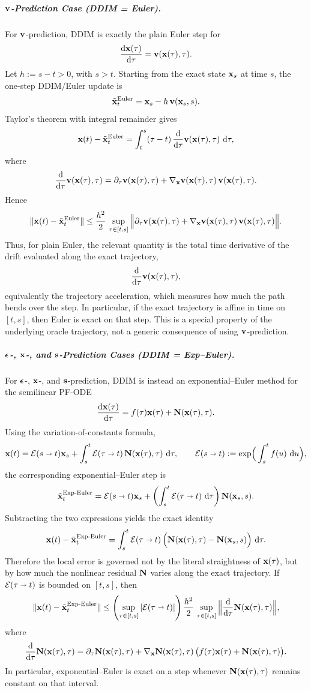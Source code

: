 \subparagraph{${\mathbf{v}}$-Prediction Case (DDIM = Euler).}
For ${\mathbf{v}}$-prediction, DDIM is exactly the plain Euler step for
\[
\frac{\mathop{}\!\mathrm{d} {\mathbf{x}}(\tau)}{\mathop{}\!\mathrm{d} \tau}={\mathbf{v}}({\mathbf{x}}(\tau),\tau).
\]
Let $h:=s-t>0$, with $s>t$. Starting from the exact state ${\mathbf{x}}_s$ at
time $s$, the one-step DDIM/Euler update is
\[
\tilde{{\mathbf{x}}}_t^{\mathrm{Euler}}
=
{\mathbf{x}}_s-h\,{\mathbf{v}}({\mathbf{x}}_s,s).
\]
Taylor's theorem with integral remainder gives
\[
{\mathbf{x}}(t)-\tilde{{\mathbf{x}}}_t^{\mathrm{Euler}}
=
\int_t^s (\tau-t)\,
\frac{\mathop{}\!\mathrm{d}}{\mathop{}\!\mathrm{d} \tau}{\mathbf{v}}({\mathbf{x}}(\tau),\tau)\,\mathop{}\!\mathrm{d}\tau,
\]
where
\[
\frac{\mathop{}\!\mathrm{d}}{\mathop{}\!\mathrm{d} \tau}{\mathbf{v}}({\mathbf{x}}(\tau),\tau)
=
\partial_\tau {\mathbf{v}}({\mathbf{x}}(\tau),\tau)
+
\nabla_{{\mathbf{x}}}{\mathbf{v}}({\mathbf{x}}(\tau),\tau)\,{\mathbf{v}}({\mathbf{x}}(\tau),\tau).
\]
Hence
\[
\|{\mathbf{x}}(t)-\tilde{{\mathbf{x}}}_t^{\mathrm{Euler}}\|
\le
\frac{h^2}{2}\,
\sup_{\tau\in[t,s]}
\Big\|
\partial_\tau {\mathbf{v}}({\mathbf{x}}(\tau),\tau)
+
\nabla_{{\mathbf{x}}}{\mathbf{v}}({\mathbf{x}}(\tau),\tau)\,{\mathbf{v}}({\mathbf{x}}(\tau),\tau)
\Big\|.
\]
Thus, for plain Euler, the relevant quantity is the total time
derivative of the drift evaluated along the exact trajectory,
\[
\frac{\mathop{}\!\mathrm{d}}{\mathop{}\!\mathrm{d} \tau}{\mathbf{v}}({\mathbf{x}}(\tau),\tau),
\]
equivalently the trajectory acceleration, which measures how much the
path bends over the step. In particular, if the exact trajectory is
affine in time on $[t,s]$, then Euler is exact on that step. This is a
special property of the underlying oracle trajectory, not a generic
consequence of using ${\mathbf{v}}$-prediction.

\subparagraph{${\bm{\epsilon}}$-, ${\mathbf{x}}$-, and ${\mathbf{s}}$-Prediction Cases (DDIM = Exp--Euler).}
For ${\bm{\epsilon}}$-, ${\mathbf{x}}$-, and ${\mathbf{s}}$-prediction, DDIM is instead an
exponential--Euler method for the semilinear PF-ODE
\[
\frac{\mathop{}\!\mathrm{d} {\mathbf{x}}(\tau)}{\mathop{}\!\mathrm{d} \tau}
=
f(\tau){\mathbf{x}}(\tau)+{\mathbf{N}}({\mathbf{x}}(\tau),\tau).
\]
Using the variation-of-constants formula,
\[
{\mathbf{x}}(t)
=
\mathcal E(s\shortrightarrow t){\mathbf{x}}_s
+
\int_s^t
\mathcal E(\tau\shortrightarrow t)\,
{\mathbf{N}}({\mathbf{x}}(\tau),\tau)\,\mathop{}\!\mathrm{d}\tau,
\qquad
\mathcal E(s\shortrightarrow t)
:=
\exp\!\Big(\int_s^t f(u)\,\mathop{}\!\mathrm{d} u\Big),
\]
the corresponding exponential--Euler step is
\[
\tilde{{\mathbf{x}}}_t^{\mathrm{Exp}\text{-}\mathrm{Euler}}
=
\mathcal E(s\shortrightarrow t){\mathbf{x}}_s
+
\left(\int_s^t \mathcal E(\tau\shortrightarrow t)\,\mathop{}\!\mathrm{d}\tau\right)
{\mathbf{N}}({\mathbf{x}}_s,s).
\]
Subtracting the two expressions yields the exact identity
\[
{\mathbf{x}}(t)-\tilde{{\mathbf{x}}}_t^{\mathrm{Exp}\text{-}\mathrm{Euler}}
=
\int_s^t
\mathcal E(\tau\shortrightarrow t)\,
\Big(
{\mathbf{N}}({\mathbf{x}}(\tau),\tau)-{\mathbf{N}}({\mathbf{x}}_s,s)
\Big)\,\mathop{}\!\mathrm{d}\tau.
\]
Therefore the local error is governed not by the literal straightness of
${\mathbf{x}}(\tau)$, but by how much the nonlinear residual ${\mathbf{N}}$ varies along
the exact trajectory. If $\mathcal E(\tau\shortrightarrow t)$ is bounded
on $[t,s]$, then
\[
\|{\mathbf{x}}(t)-\tilde{{\mathbf{x}}}_t^{\mathrm{Exp}\text{-}\mathrm{Euler}}\|
\le
\left(\sup_{\tau\in[t,s]}|\mathcal E(\tau\shortrightarrow t)|\right)
\frac{h^2}{2}\,
\sup_{\tau\in[t,s]}
\Big\|
\frac{\mathop{}\!\mathrm{d}}{\mathop{}\!\mathrm{d} \tau}{\mathbf{N}}({\mathbf{x}}(\tau),\tau)
\Big\|,
\]
where
\[
\frac{\mathop{}\!\mathrm{d}}{\mathop{}\!\mathrm{d} \tau}{\mathbf{N}}({\mathbf{x}}(\tau),\tau)
=
\partial_\tau {\mathbf{N}}({\mathbf{x}}(\tau),\tau)
+
\nabla_{{\mathbf{x}}}{\mathbf{N}}({\mathbf{x}}(\tau),\tau)\,
\bigl(f(\tau){\mathbf{x}}(\tau)+{\mathbf{N}}({\mathbf{x}}(\tau),\tau)\bigr).
\]
In particular, exponential--Euler is exact on a step whenever
${\mathbf{N}}({\mathbf{x}}(\tau),\tau)$ remains constant on that interval.

